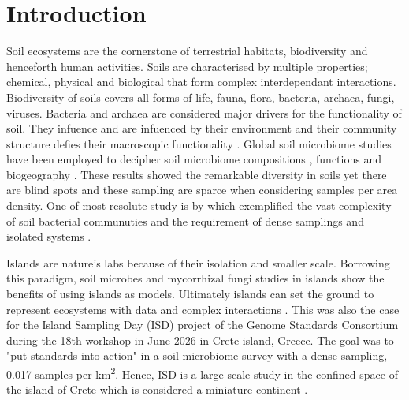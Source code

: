 \documentclass[unnumsec,webpdf,contemporary,large]{oup-authoring-template}%
\theoremstyle{thmstyleone}%
\theoremstyle{thmstyletwo}%
\theoremstyle{thmstylethree}%
\begin{document}
\maketitle

\section{Introduction}\label{intro}

Soil ecosystems are the cornerstone of terrestrial habitats, biodiversity and henceforth human activities.
Soils are characterised by multiple properties; chemical, physical and biological that 
form complex interdependant interactions. Biodiversity of soils covers
all forms of life, fauna, flora, bacteria, archaea, fungi, viruses. 
Bacteria and archaea are considered major drivers for the functionality of soil.
They infuence and are infuenced by their environment and their community structure 
defies their macroscopic functionality \cite{Bahram2018}.
Global soil microbiome studies have been employed to decipher soil microbiome
compositions \cite{thompson2017a-communal, Delgado-Baquerizo2018, Labouyrie2023},
functions \cite{Bahram2018} and biogeography \cite{Martiny2006, Guerra2020}.
These results showed the remarkable diversity in soils yet there are blind spots \cite{Guerra2020}
and these sampling are sparce when considering samples per area density. One of most resolute
study is by \cite{Karimi2020} which exemplified the 
vast complexity of soil bacterial communuties and the requirement of
dense samplings and isolated systems \cite{Dini-Andreote2021}.

Islands are nature's labs \cite{Whittaker2017} because of their isolation and smaller scale.
Borrowing this paradigm, soil microbes \cite{Li2020} and mycorrhizal fungi \cite{Delavaux2021} studies
in islands show the benefits of using islands as models. Ultimately islands can
set the ground to represent ecosystems with data and complex interactions \cite{Davies2016}.
This was also the case for the Island Sampling Day (ISD) project \cite{holm2024}
of the Genome Standards Consortium \cite{Field2011}
during the 18th workshop in June 2026 in Crete island, Greece. The goal was to "put standards into action"
in a soil microbiome survey with a dense sampling, 0.017 samples per km\textsuperscript{2}.
Hence, ISD is a large scale study in the confined space of the island of Crete which 
is considered a miniature continent \cite{Vogiatzakis2008_crete}.
\end{document}
